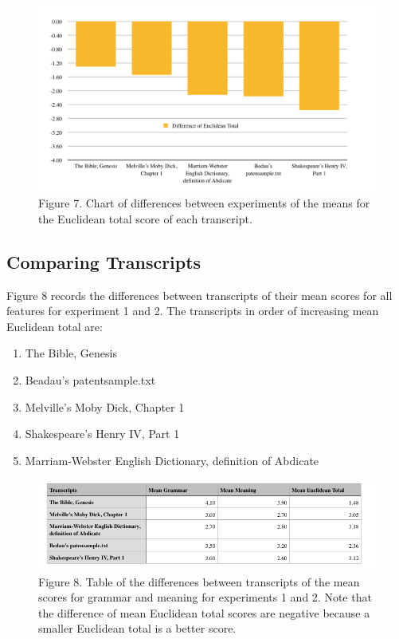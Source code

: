 \documentclass{article}
\begin{document}
\begin{figure}[h]
\centering
\includegraphics[width=15cm,keepaspectratio]{images/lang-diffs-euclid-chart.png}
\captionsetup{labelformat=empty} \caption{Figure 7. Chart of differences between experiments of the means for the Euclidean total score of each transcript.}
\end{figure}
\subsection{Comparing Transcripts}


Figure 8 records the differences between transcripts of their mean scores for all features for experiment 1 and 2. 
The transcripts in order of increasing mean Euclidean total are:


\begin{enumerate}
\item The Bible, Genesis


\item Beadau's patentsample.txt


\item Melville's Moby Dick, Chapter 1


\item Shakespeare's Henry IV, Part 1


\item Marriam-Webster English Dictionary, definition of Abdicate

\end{enumerate}
\begin{figure}[h]
\centering
\includegraphics[width=15cm,keepaspectratio]{images/trans-diffs-all-table.png}
\captionsetup{labelformat=empty} \caption{Figure 8. Table of the differences between transcripts of the mean scores for grammar and meaning for experiments 1 and 2. Note that the difference of mean Euclidean total scores are negative because a smaller Euclidean total is a better score.}
\end{figure}
\end{document}
